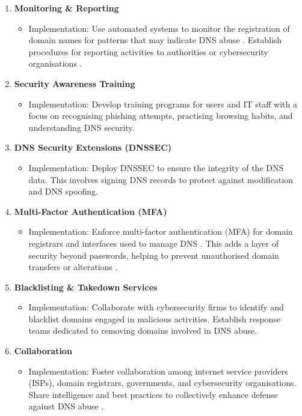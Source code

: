 \begin{enumerate}
    \item \textbf{Monitoring \& Reporting}
    \begin{itemize}
        \item Implementation: Use automated systems to monitor the registration of domain names for patterns that may indicate DNS abuse \cite{icannndnssec}. Establish procedures for reporting activities to authorities or cybersecurity organisations \cite{lucas2021tls}.
    \end{itemize}
    \item \textbf{Security Awareness Training}
    \begin{itemize}
        \item Implementation: Develop training programs for users and IT staff with a focus on recognising phishing attempts, practising browsing habits, and understanding DNS security.
    \end{itemize}
    \item \textbf{DNS Security Extensions (DNSSEC)}
    \begin{itemize}
        \item Implementation: Deploy DNSSEC to ensure the integrity of the DNS data. This involves signing DNS records to protect against modification and DNS spoofing.
    \end{itemize}
    \item \textbf{Multi-Factor Authentication (MFA)}
    \begin{itemize}
        \item Implementation: Enforce multi-factor authentication (MFA) for domain registrars and interfaces used to manage DNS \cite{icannndnssec}. This adds a layer of security beyond passwords, helping to prevent unauthorised domain transfers or alterations \cite{moghaddam2014ecco}.
    \end{itemize}
    \item \textbf{Blacklisting \& Takedown Services}
    \begin{itemize}
        \item Implementation: Collaborate with cybersecurity firms to identify and blacklist domains engaged in malicious activities. Establish response teams dedicated to removing domains involved in DNS abuse.
    \end{itemize}
    \item \textbf{Collaboration}
    \begin{itemize}
        \item Implementation: Foster collaboration among internet service providers (ISPs), domain registrars, governments, and cybersecurity organisations. Share intelligence and best practices to collectively enhance defense against DNS abuse \cite{skopik2017collaborative}.

\end{itemize}
\end{enumerate}
